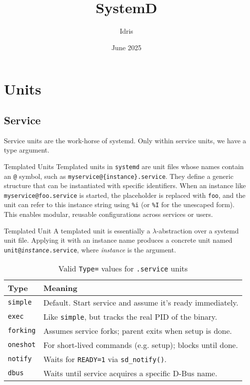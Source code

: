 \documentclass[openany, 12pt]{book}
\title{SystemD}
\author{Idris}
\date{June 2025}
\begin{document}
\tableofcontents

\chapter{Units}
\section{Service}
Service units are the work-horse of systemd. Only within service units, we have
a type argument.

\begin{definition}{Templated Units}{}
  Templated units in \texttt{systemd} are unit files whose names contain an
  \texttt{@} symbol, such as \texttt{myservice@\{instance\}.service}. They define
  a generic structure that can be instantiated with specific identifiers. When an
  instance like \texttt{myservice@foo.service} is started, the placeholder is
  replaced with \texttt{foo}, and the unit can refer to this instance string using
  \texttt{\%i} (or \texttt{\%I} for the unescaped form). This enables modular,
  reusable configurations across services or users.
\end{definition}

\begin{intuition}{Templated Unit}{}
  A templated unit is essentially a $\lambda$-abstraction over a systemd unit
  file. Applying it with an instance name produces a concrete unit named
  \texttt{unit@\textit{instance}.service}, where \textit{instance} is the
  argument.
\end{intuition}

\begin{table}[ht]
  \centering
  \begin{tabular}{@{}ll@{}}
    \toprule
    \textbf{Type}    & \textbf{Meaning}                                             \\
    \midrule
    \texttt{simple}  & Default. Start service and assume it's ready immediately.    \\
    \texttt{exec}    & Like \texttt{simple}, but tracks the real PID of the binary. \\
    \texttt{forking} & Assumes service forks; parent exits when setup is done.      \\
    \texttt{oneshot} & For short-lived commands (e.g. setup); blocks until done.    \\
    \texttt{notify}  & Waits for \texttt{READY=1} via \texttt{sd\_notify()}.        \\
    \texttt{dbus}    & Waits until service acquires a specific D-Bus name.          \\
    \bottomrule
  \end{tabular}
  \caption{Valid \texttt{Type=} values for \texttt{.service} units}
\end{table}
\end{document}
